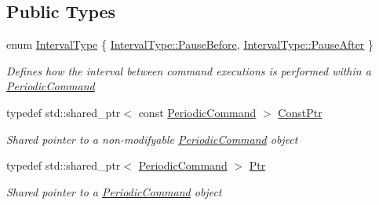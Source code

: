 \subsection*{Public Types}
\begin{DoxyCompactItemize}
\item 
enum \mbox{\hyperlink{class_command_lib_1_1_periodic_command_ac32ef93cf679cd652da30a0ad373d31e}{Interval\+Type}} \{ \mbox{\hyperlink{class_command_lib_1_1_periodic_command_ac32ef93cf679cd652da30a0ad373d31ea9df9cbfe0251b1b5670ee8ce058bd287}{Interval\+Type\+::\+Pause\+Before}}, 
\mbox{\hyperlink{class_command_lib_1_1_periodic_command_ac32ef93cf679cd652da30a0ad373d31ea4ccaa10bfe2d79ac758dfa35d4ca588f}{Interval\+Type\+::\+Pause\+After}}
 \}
\begin{DoxyCompactList}\small\item\em Defines how the interval between command executions is performed within a \mbox{\hyperlink{class_command_lib_1_1_periodic_command}{Periodic\+Command}} \end{DoxyCompactList}\item 
typedef std\+::shared\+\_\+ptr$<$ const \mbox{\hyperlink{class_command_lib_1_1_periodic_command}{Periodic\+Command}} $>$ \mbox{\hyperlink{class_command_lib_1_1_periodic_command_ad004e7ccaad4b0413f341dac73d050fc}{Const\+Ptr}}
\begin{DoxyCompactList}\small\item\em Shared pointer to a non-\/modifyable \mbox{\hyperlink{class_command_lib_1_1_periodic_command}{Periodic\+Command}} object\end{DoxyCompactList}\item 
typedef std\+::shared\+\_\+ptr$<$ \mbox{\hyperlink{class_command_lib_1_1_periodic_command}{Periodic\+Command}} $>$ \mbox{\hyperlink{class_command_lib_1_1_periodic_command_a4aa1af2412d7688c7b9a5d76b240b38a}{Ptr}}
\begin{DoxyCompactList}\small\item\em Shared pointer to a \mbox{\hyperlink{class_command_lib_1_1_periodic_command}{Periodic\+Command}} object\end{DoxyCompactList}\end{DoxyCompactItemize}
